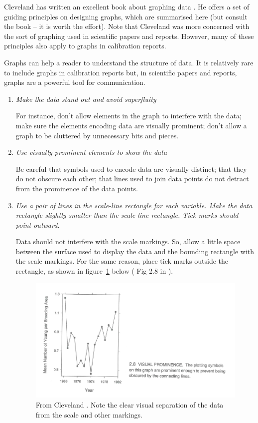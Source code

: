 Cleveland has written an excellent book about graphing data \cite{Cleveland}. He offers a set of guiding principles on designing graphs, which are summarised here (but consult the book – it is worth the effort). Note that Cleveland was more concerned with the sort of graphing used in scientific papers and reports. However, many of these principles also apply to graphs in calibration reports.

Graphs can help a reader to understand the structure of data. It is relatively rare to include graphs in calibration reports but, in scientific papers and reports, graphs are a powerful tool for communication.


\begin{enumerate}

\item	\textit{Make the data stand out and avoid superfluity}

For instance, don’t allow elements in the graph to interfere with the data; make sure the elements encoding data are visually prominent; don’t allow a graph to be cluttered by unnecessary bits and pieces.

\item	\textit{Use visually prominent elements to show the data}

Be careful that symbols used to encode data are visually distinct; that they do not obscure each other; that lines used to join data points do not detract from the prominence of the data points.

\item	\textit{Use a pair of lines in the scale-line rectangle for each variable. Make the data rectangle slightly smaller than the scale-line rectangle. Tick marks should point outward.}

Data should not interfere with the scale markings. So, allow a little space between the surface used to display the data and the bounding rectangle with the scale markings. For the same reason, place tick marks outside the rectangle, as shown in figure~\ref{fig:cleveland_promience} below ( Fig 2.8 in \cite{Cleveland} ).

\begin{figure}[ht]
\centering
\includegraphics[scale=1]{pictures/visual_prominence}
\caption{From Cleveland \cite{Cleveland}. Note the clear visual separation of the data from the scale and other markings.}
\label{fig:cleveland_promience}
\end{figure}


\end{enumerate}
